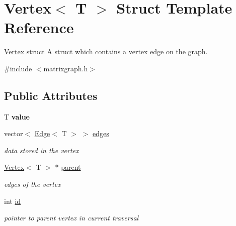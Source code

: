 \hypertarget{struct_vertex}{}\section{Vertex$<$ T $>$ Struct Template Reference}
\label{struct_vertex}


\mbox{\hyperlink{struct_vertex}{Vertex}} struct A struct which contains a vertex edge on the graph.  




{\ttfamily \#include $<$matrixgraph.\+h$>$}

\subsection*{Public Attributes}
\begin{DoxyCompactItemize}
\item 
\mbox{\label{struct_vertex_a32215567c5d032db010fa92d2b703682}} 
T {\bfseries value}
\item 
\mbox{\label{struct_vertex_aae153273eb0e612e0f76f1a3c5246e7c}} 
vector$<$ \mbox{\hyperlink{struct_edge}{Edge}}$<$ T $>$ $>$ \mbox{\hyperlink{struct_vertex_aae153273eb0e612e0f76f1a3c5246e7c}{edges}}
\begin{DoxyCompactList}\small\item\em data stored in the vertex \end{DoxyCompactList}\item 
\mbox{\label{struct_vertex_aa631b08e7a90a3a41bc7f52cf044d929}} 
\mbox{\hyperlink{struct_vertex}{Vertex}}$<$ T $>$ $\ast$ \mbox{\hyperlink{struct_vertex_aa631b08e7a90a3a41bc7f52cf044d929}{parent}}
\begin{DoxyCompactList}\small\item\em edges of the vertex \end{DoxyCompactList}\item 
\mbox{\label{struct_vertex_aee0ae544b6124250fd4e758e181c3b90}} 
int \mbox{\hyperlink{struct_vertex_aee0ae544b6124250fd4e758e181c3b90}{id}}
\begin{DoxyCompactList}\small\item\em pointer to parent vertex in current traversal \end{DoxyCompactList}\item 

\end{DoxyCompactItemize}
